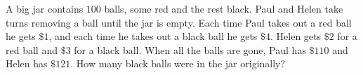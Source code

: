 A big jar contains $100$ balls, some red and the rest black. Paul and Helen take turns removing a ball until the jar is empty. Each time Paul takes out a red ball he gets $\$1$, and each time he takes out a black ball he gets $\$4$. Helen gets $\$2$ for a red ball and $\$3$ for a black ball. When all the balls are gone, Paul has $\$110$ and Helen has $\$121$. How many black balls were in the jar originally?
